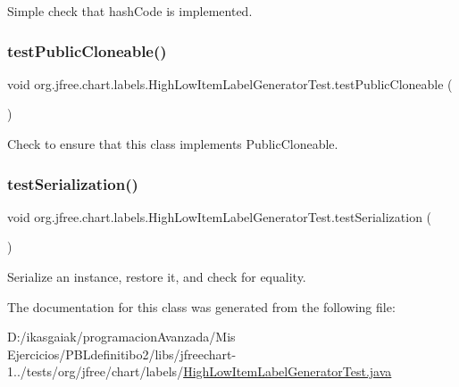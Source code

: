 Simple check that hash\+Code is implemented. \mbox{\label{classorg_1_1jfree_1_1chart_1_1labels_1_1_high_low_item_label_generator_test_a0ec70ca0724df03e52f58c349ebe4d03}} 
\subsubsection{\texorpdfstring{test\+Public\+Cloneable()}{testPublicCloneable()}}
{\footnotesize\ttfamily void org.\+jfree.\+chart.\+labels.\+High\+Low\+Item\+Label\+Generator\+Test.\+test\+Public\+Cloneable (\begin{DoxyParamCaption}{ }\end{DoxyParamCaption})}

Check to ensure that this class implements Public\+Cloneable. \mbox{\label{classorg_1_1jfree_1_1chart_1_1labels_1_1_high_low_item_label_generator_test_a318d56b668189b48673242e6b1598f94}} 
\subsubsection{\texorpdfstring{test\+Serialization()}{testSerialization()}}
{\footnotesize\ttfamily void org.\+jfree.\+chart.\+labels.\+High\+Low\+Item\+Label\+Generator\+Test.\+test\+Serialization (\begin{DoxyParamCaption}{ }\end{DoxyParamCaption})}

Serialize an instance, restore it, and check for equality. 

The documentation for this class was generated from the following file\+:\begin{DoxyCompactItemize}
\item 
D\+:/ikasgaiak/programacion\+Avanzada/\+Mis Ejercicios/\+P\+B\+Ldefinitibo2/libs/jfreechart-\/1../tests/org/jfree/chart/labels/\mbox{\hyperlink{_high_low_item_label_generator_test_8java}{High\+Low\+Item\+Label\+Generator\+Test.\+java}}\end{DoxyCompactItemize}
